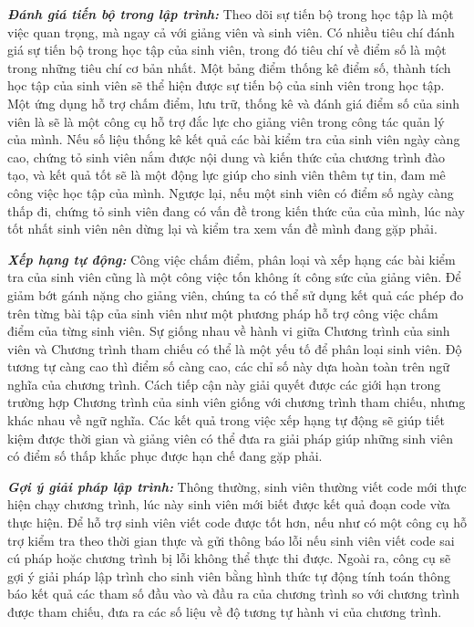 \textbf{\textit{Đánh giá tiến bộ trong lập trình:}} Theo dõi sự tiến
bộ trong học tập là một việc quan trọng, mà ngay cả với giảng viên và
sinh viên. Có nhiều tiêu chí đánh giá sự tiến bộ trong học tập của
sinh viên, trong đó tiêu chí về điểm số là một trong những tiêu chí cơ
bản nhất. Một bảng điểm thống kê điểm số, thành tích học tập của sinh
viên sẽ thể hiện được sự tiến bộ của sinh viên trong học tập. Một ứng
dụng hỗ trợ chấm điểm, lưu trữ, thống kê và đánh giá điểm số của sinh
viên là sẽ là một công cụ hỗ trợ đắc lực cho giảng viên trong công tác
quản lý của mình. Nếu số liệu thống kê kết quả các bài kiểm tra của
sinh viên ngày càng cao, chứng tỏ sinh viên nắm được nội dung và kiến
thức của chương trình đào tạo, và kết quả tốt sẽ là một động lực giúp
cho sinh viên thêm tự tin, đam mê công việc học tập của mình. Ngược
lại, nếu một sinh viên có điểm số ngày càng thấp đi, chứng tỏ sinh
viên đang có vấn đề trong kiến thức của của mình, lúc này tốt nhất
sinh viên nên dừng lại và kiểm tra xem vấn đề mình đang gặp phải.

\textit{\textbf{Xếp hạng tự động:}} Công việc chấm điểm, phân loại và
xếp hạng các bài kiểm tra của sinh viên cũng là một công việc tốn
không ít công sức của giảng viên. Để giảm bớt gánh nặng cho giảng
viên, chúng ta có thể sử dụng kết quả các phép đo trên từng bài tập
của sinh viên như một phương pháp hỗ trợ công việc chấm điểm của từng
sinh viên. Sự giống nhau về hành vi giữa Chương trình của sinh viên và
Chương trình tham chiếu có thể là một yếu tố để phân loại sinh
viên. Độ tương tự càng cao thì điểm số càng cao, các chỉ số này dựa
hoàn toàn trên ngữ nghĩa của chương trình. Cách tiếp cận này giải
quyết được các giới hạn trong trường hợp Chương trình của sinh viên
giống với chương trình tham chiếu, nhưng khác nhau về ngữ nghĩa. Các
kết quả trong việc xếp hạng tự động sẽ giúp tiết kiệm được thời gian
và giảng viên có thể đưa ra giải pháp giúp những sinh viên có điểm số
thấp khắc phục được hạn chế đang gặp phải.

\textit{\textbf{Gợi ý giải pháp lập trình:}} Thông thường, sinh viên
thường viết code mới thực hiện chạy chương trình, lúc này sinh viên
mới biết được kết quả đoạn code vừa thực hiện. Để hỗ trợ sinh viên
viết code được tốt hơn, nếu như có một công cụ hỗ trợ kiểm tra theo
thời gian thực và gửi thông báo lỗi nếu sinh viên viết code sai cú
pháp hoặc chương trình bị lỗi không thể thực thi được. Ngoài ra, công
cụ sẽ gợi ý giải pháp lập trình cho sinh viên bằng hình thức tự động
tính toán thông báo kết quả các tham số đầu vào và đầu ra của chương
trình so với chương trình được tham chiếu, đưa ra các số liệu về độ
tương tự hành vi của chương trình.

